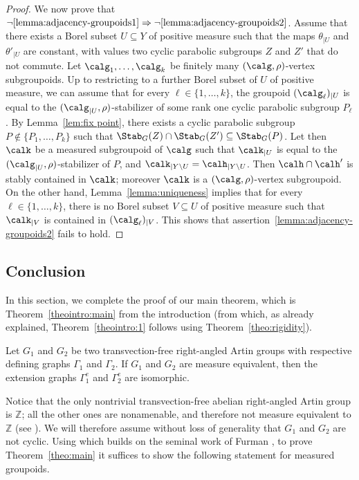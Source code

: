\begin{proof}
We now prove that $\neg \eqref{lemma:adjacency-groupoids1}\Rightarrow \neg \eqref{lemma:adjacency-groupoids2}$. Assume that there exists a Borel subset $U\subseteq Y$ of positive measure such that the maps $\theta_{|U}$ and $\theta'_{|U}$ are constant, with values two cyclic parabolic subgroups $Z$ and $Z'$ that do not commute. Let $\calg_1,\dots,\calg_k$ be finitely many $(\calg,\rho)$-vertex subgroupoids. Up to restricting to a further Borel subset of $U$ of positive measure, we can assume that for every $\ell\in\{1,\dots,k\}$, the groupoid $(\calg_\ell)_{|U}$ is equal to the $(\calg_{|U},\rho)$-stabilizer of some rank one cyclic parabolic subgroup $P_\ell$. By Lemma~\ref{lem:fix point}, there exists a cyclic parabolic subgroup $P\notin\{P_1,\dots,P_k\}$ such that $\Stab_G(Z)\cap\Stab_G(Z')\subseteq\Stab_G(P)$. Let then $\calk$ be a measured subgroupoid of $\calg$ such that $\calk_{|U}$ is equal to the $(\calg_{|U},\rho)$-stabilizer of $P$, and $\calk_{|Y\setminus U}=\calh_{|Y\setminus U}$. Then $\calh\cap\calh'$ is stably contained in $\calk$; moreover $\calk$ is a $(\calg,\rho)$-vertex subgroupoid. On the other hand, Lemma~\ref{lemma:uniqueness} implies that for every $\ell\in\{1,\dots,k\}$, there is no Borel subset $V\subseteq U$ of positive measure such that $\calk_{|V}$ is contained in $(\calg_\ell)_{|V}$. This shows that assertion~\eqref{lemma:adjacency-groupoids2} fails to hold.
\end{proof}

\subsection{Conclusion}

In this section, we complete the proof of our main theorem, which is Theorem~\ref{theointro:main} from the introduction (from which, as already explained, Theorem~\ref{theointro:1} follows using Theorem~\ref{theo:rigidity}).

\begin{theo}\label{theo:main}
Let $G_1$ and $G_2$ be two transvection-free right-angled Artin groups with respective defining graphs $\Gamma_1$ and $\Gamma_2$. If $G_1$ and $G_2$ are measure equivalent, then the extension graphs $\Gamma_1^e$ and $\Gamma_2^e$ are isomorphic.
\end{theo}

Notice that the only nontrivial transvection-free abelian right-angled Artin group is $\mathbb{Z}$; all the other ones are nonamenable, and therefore not measure equivalent to $\mathbb{Z}$ (see \cite[Cor.\,3.2]{Fur-survey}). We will therefore assume without loss of generality that $G_1$ and $G_2$ are not cyclic. Using \cite[Prop.\,5.11]{HH} which builds on the seminal work of Furman \cite{Fur2}, to prove Theorem~\ref{theo:main} it suffices to show the following statement for measured groupoids.

